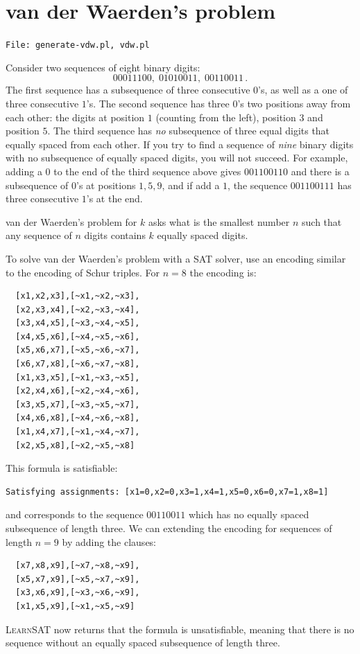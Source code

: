 \documentclass[11pt]{report}
\newcommand*{\p}[1]{\textup{\texttt{#1}}}
\newcommand*{\ls}{\textsc{LearnSAT}}
\newcommand*{\fl}[1]{\parbox{\textwidth}{\raggedleft \p{File: #1}}}
\begin{document}
\section{van der Waerden's problem}

\fl{generate-vdw.pl, vdw.pl}

Consider two sequences of eight binary digits:
\[
00011100,\; 01010011,\; 00110011\,.
\]
The first sequence has a subsequence of three consecutive $0$'s, as well as a one of three consecutive $1$'s. The second sequence has three $0$'s two positions away from each other: the digits at position $1$ (counting from the left), position $3$ and position $5$. The third sequence has \emph{no} subsequence of three equal digits that equally spaced from each other. If you try to find a sequence of \emph{nine} binary digits with no subsequence of equally spaced digits, you will not succeed. For example, adding a $0$ to the end of the third sequence above gives $001100110$ and there is a subsequence of $0$'s at positions $1,5,9$, and if add a $1$, the sequence $001100111$ has three consecutive $1$'s at the end.

van der Waerden's problem for $k$ asks what is the smallest number $n$ such that any sequence of $n$ digits contains $k$ equally spaced digits.

To solve van der Waerden's problem with a SAT solver, use an encoding similar to the encoding of Schur triples. For $n=8$ the encoding is:
\begin{verbatim}
  [x1,x2,x3],[~x1,~x2,~x3],
  [x2,x3,x4],[~x2,~x3,~x4],
  [x3,x4,x5],[~x3,~x4,~x5],
  [x4,x5,x6],[~x4,~x5,~x6],
  [x5,x6,x7],[~x5,~x6,~x7],
  [x6,x7,x8],[~x6,~x7,~x8],
  [x1,x3,x5],[~x1,~x3,~x5],
  [x2,x4,x6],[~x2,~x4,~x6],
  [x3,x5,x7],[~x3,~x5,~x7],
  [x4,x6,x8],[~x4,~x6,~x8],
  [x1,x4,x7],[~x1,~x4,~x7],
  [x2,x5,x8],[~x2,~x5,~x8]
\end{verbatim}
This formula is satisfiable:
\begin{verbatim}
Satisfying assignments: [x1=0,x2=0,x3=1,x4=1,x5=0,x6=0,x7=1,x8=1]
\end{verbatim}
and corresponds to the sequence $00110011$ which has no equally spaced subsequence of length three. We can extending the encoding for sequences of length $n=9$ by adding the clauses:
\begin{verbatim}
  [x7,x8,x9],[~x7,~x8,~x9],
  [x5,x7,x9],[~x5,~x7,~x9],
  [x3,x6,x9],[~x3,~x6,~x9],
  [x1,x5,x9],[~x1,~x5,~x9]
\end{verbatim}
\ls{} now returns that the formula is unsatisfiable, meaning that there is no sequence without an equally spaced subsequence of length three.
\end{document}

